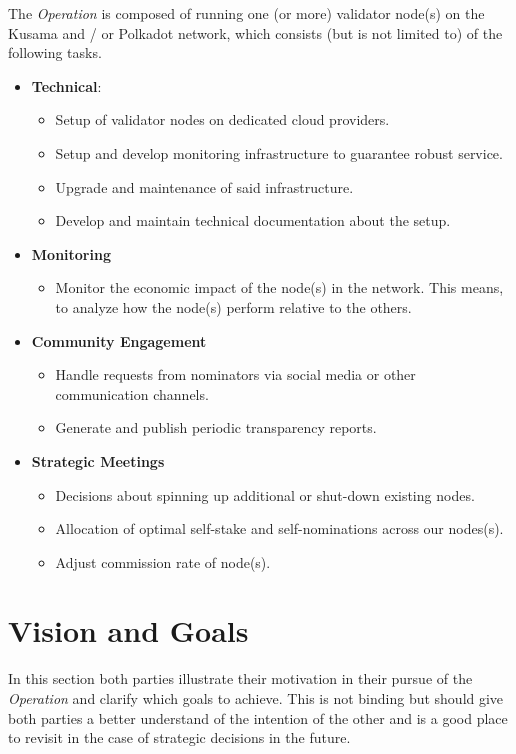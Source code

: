 \documentclass[10pt]{article}
\begin{document}
The \textit{Operation} is composed of running one (or more) validator node(s) on the Kusama and / or Polkadot network, which consists (but is not limited to) of the following tasks.
\begin{itemize}
    \item \textbf{Technical}:
    \begin{itemize}
        \item Setup of validator nodes on dedicated cloud providers.
        \item Setup and develop monitoring infrastructure to guarantee robust service.
        \item Upgrade and maintenance of said infrastructure.
        \item Develop and maintain technical documentation about the setup.
    \end{itemize}
    \item \textbf{Monitoring}
    \begin{itemize}
        \item Monitor the economic impact of the node(s) in the network. This means, to analyze how the node(s) perform relative to the others.
    \end{itemize}
    \item \textbf{Community Engagement}
    \begin{itemize}
        \item Handle requests from nominators via social media or other communication channels.
        \item Generate and publish periodic transparency reports.
    \end{itemize}
    \item \textbf{Strategic Meetings}
    \begin{itemize}
        \item Decisions about spinning up additional or shut-down existing nodes.
        \item Allocation of optimal self-stake and self-nominations across our nodes(s).
        \item Adjust commission rate of node(s).
    \end{itemize}
\end{itemize}


\section{Vision and Goals}

In this section both parties illustrate their motivation in their pursue of the \textit{Operation} and clarify which goals to achieve. This is not binding but should give both parties a better understand of the intention of the other and is a good place to revisit in the case of strategic decisions in the future.\\
\end{document}
